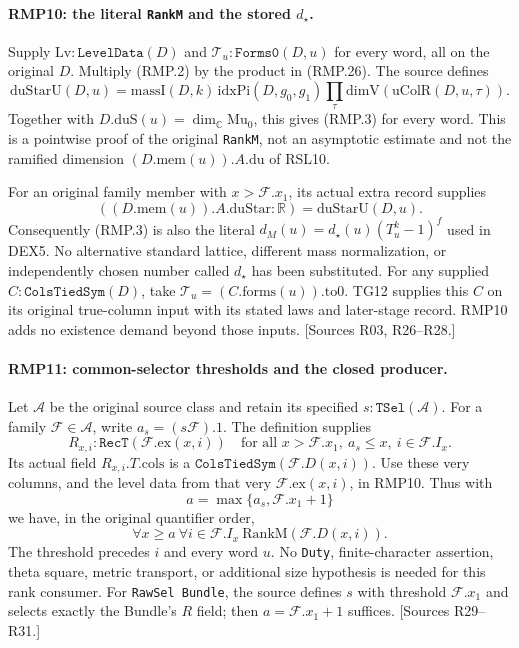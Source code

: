 \paragraph{RMP10: the literal \texttt{RankM} and the stored $d_\star$.}
\label{claim:RMP10}
Supply $\mathrm{Lv}:\texttt{LevelData}(D)$ and
$\mathcal T_u:\texttt{Forms0}(D,u)$ for every word, all on the
original $D$. Multiply (RMP.2) by the product in (RMP.26).
The source defines
\[
 \mathrm{duStarU}(D,u)
   =\mathrm{massI}(D,k)\,\mathrm{idxPi}(D,g_0,g_1)
        \prod_\tau\mathrm{dimV}(\mathrm{uColR}(D,u,\tau)).
                                                               \tag{RMP.27}
\]
Together with $D.\mathrm{duS}(u)=\dim_{\mathbb C}\mathrm{Mu}_0$,
this gives (RMP.3) for every word. This is a pointwise proof of the
original \texttt{RankM}, not an asymptotic estimate and not the
ramified dimension $(D.\mathrm{mem}(u)).A.\mathrm{du}$ of RSL10.

For an original family member with $x>\mathcal F.x_1$, its actual
extra record supplies
\[
  ((D.\mathrm{mem}(u)).A.\mathrm{duStar}:\mathbb R)
       =\mathrm{duStarU}(D,u).                         \tag{RMP.28}
\]
Consequently (RMP.3) is also the literal
$d_M(u)=d_\star(u)(T_u^k-1)^f$ used in DEX5.
No alternative standard lattice, different mass normalization,
or independently chosen number called $d_\star$ has been substituted.
For any supplied $C:\texttt{ColsTiedSym}(D)$, take
$\mathcal T_u=(C.\mathrm{forms}(u)).\mathrm{to0}$.
TG12 supplies this $C$ on its original true-column input with its
stated laws and later-stage record. RMP10 adds no existence demand
beyond those inputs. [Sources R03, R26--R28.]

\paragraph{RMP11: common-selector thresholds and the closed producer.}
\label{claim:RMP11}
Let $\mathcal A$ be the original source class and retain its
specified $s:\texttt{TSel}(\mathcal A)$. For a family
$\mathcal F\in\mathcal A$, write $a_s=(s\mathcal F).1$.
The definition supplies
\[
 R_{x,i}:\texttt{RecT}(\mathcal F.\mathrm{ex}(x,i))
 \quad\text{for all }x>\mathcal F.x_1,\ a_s\le x,
                         \ i\in\mathcal F.I_x.         \tag{RMP.29}
\]
Its actual field $R_{x,i}.T.\mathrm{cols}$ is a
$\texttt{ColsTiedSym}(\mathcal F.D(x,i))$. Use these very columns,
and the level data from that very $\mathcal F.\mathrm{ex}(x,i)$,
in RMP10. Thus with
\[
                   a=\max\{a_s,\mathcal F.x_1+1\}
                                                               \tag{RMP.30}
\]
we have, in the original quantifier order,
\[
 \forall x\ge a\ \forall i\in\mathcal F.I_x\
                      \mathrm{RankM}(\mathcal F.D(x,i)).
                                                               \tag{RMP.31}
\]
The threshold precedes $i$ and every word $u$. No \texttt{Duty},
finite-character assertion, theta square, metric transport, or
additional size hypothesis is needed for this rank consumer.
For \texttt{RawSel Bundle}, the source defines $s$ with threshold
$\mathcal F.x_1$ and selects exactly the Bundle's $R$ field;
then $a=\mathcal F.x_1+1$ suffices. [Sources R29--R31.]

